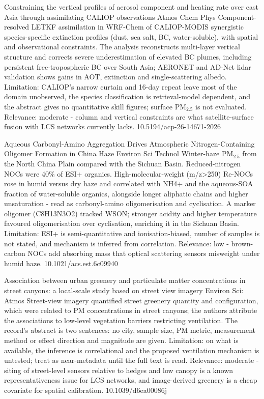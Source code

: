 \documentclass[10pt]{article}
\begin{document}
{Constraining the vertical profiles of aerosol component and heating rate over east Asia through assimilating CALIOP observations}
{Atmos Chem Phys}
{Component-resolved LETKF assimilation in WRF-Chem of CALIOP-MODIS synergistic species-specific extinction profiles (dust, sea salt, BC, water-soluble), with spatial and observational constraints. The analysis reconstructs multi-layer vertical structure and corrects severe underestimation of elevated BC plumes, including persistent free-tropospheric BC over South Asia; AERONET and AD-Net lidar validation shows gains in AOT, extinction and single-scattering albedo. Limitation: CALIOP's narrow curtain and 16-day repeat leave most of the domain unobserved, the species classification is retrieval-model dependent, and the abstract gives no quantitative skill figures; surface PM$_{2.5}$ is not evaluated. Relevance: moderate - column and vertical constraints are what satellite-surface fusion with LCS networks currently lacks.}
{10.5194/acp-26-14671-2026}

{Aqueous Carbonyl-Amino Aggregation Drives Atmospheric Nitrogen-Containing Oligomer Formation in China Haze}
{Environ Sci Technol}
{Winter-haze PM$_{2.5}$ from the North China Plain compared with the Sichuan Basin. Reduced-nitrogen NOCs were 40\% of ESI+ organics. High-molecular-weight (m/z>250) Re-NOCs rose in humid versus dry haze and correlated with NH4+ and the aqueous-SOA fraction of water-soluble organics, alongside longer aliphatic chains and higher unsaturation - read as carbonyl-amino oligomerisation and cyclisation. A marker oligomer (C8H13N3O2) tracked WSON; stronger acidity and higher temperature favoured oligomerisation over cyclisation, enriching it in the Sichuan Basin. Limitation: ESI+ is semi-quantitative and ionisation-biased, number of samples is not stated, and mechanism is inferred from correlation. Relevance: low - brown-carbon NOCs add absorbing mass that optical scattering sensors misweight under humid haze.}
{10.1021/acs.est.6c09940}

{Association between urban greenery and particulate matter concentrations in street canyons: a local-scale study based on street view imagery}
{Environ Sci: Atmos}
{Street-view imagery quantified street greenery quantity and configuration, which were related to PM concentrations in street canyons; the authors attribute the associations to low-level vegetation barriers restricting ventilation. The record's abstract is two sentences: no city, sample size, PM metric, measurement method or effect direction and magnitude are given. Limitation: on what is available, the inference is correlational and the proposed ventilation mechanism is untested; treat as near-metadata until the full text is read. Relevance: moderate - siting of street-level sensors relative to hedges and low canopy is a known representativeness issue for LCS networks, and image-derived greenery is a cheap covariate for spatial calibration.}
{10.1039/d6ea00086j}
\end{document}
